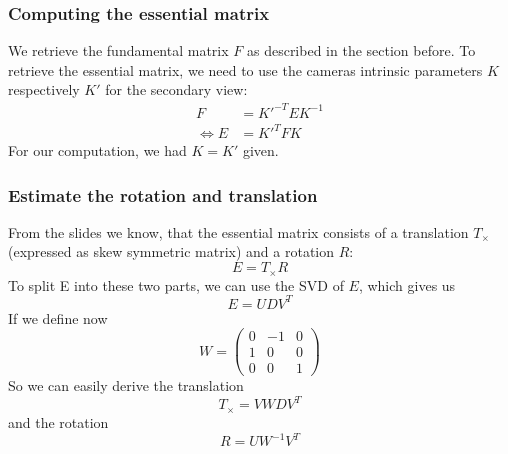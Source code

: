 \documentclass{paper}
\begin{document}
\subsubsection{Computing the essential matrix}
We retrieve the fundamental matrix $F$ as described in the section before. To
retrieve the essential matrix, we need to use the cameras intrinsic parameters $K$ respectively $K'$ for the secondary view:
\begin{align}
	 F &= K'^{-T} E K^{-1} \\
	\Longleftrightarrow E &= K'^T F K
\end{align}
For our computation, we had $K = K'$ given. 
\subsubsection{Estimate the rotation and translation}

From the slides we know, that the essential matrix consists of a translation $T_\times$ (expressed as skew symmetric matrix) and a rotation $R$:
\begin{equation}
	E = T_\times R
\end{equation}
To split E into these two parts, we can use the SVD of $E$, which gives us
\begin{equation}
	E = UDV^T
\end{equation}
If we define now
\begin{equation}
 W = \begin{pmatrix}
 	0 & -1 & 0 \\
 	1 & 0 & 0 \\
 	0 & 0 & 1
 \end{pmatrix}
\end{equation}
So we can easily derive the translation
\begin{equation}
T_\times = V W D V^T
\end{equation}
and the rotation
\begin{equation}
R = U W^{-1} V^T
\end{equation}
\end{document}
